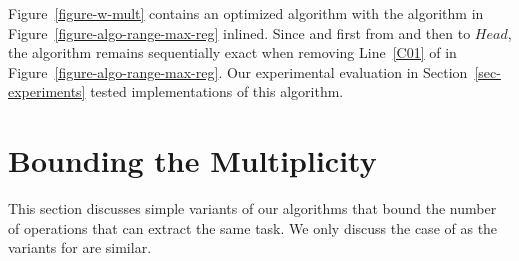 Figure~\ref{figure-w-mult} contains an optimized \NCWSM algorithm with the \RangeMaxReg algorithm in Figure~\ref{figure-algo-range-max-reg} inlined. Since \Take and \Steal first \RMaxR from and then \RMaxW to \(Head\), the algorithm remains sequentially exact when removing Line~\ref{C01} of \RMaxW in Figure~\ref{figure-algo-range-max-reg}. Our experimental evaluation in Section~\ref{sec-experiments} tested implementations of this algorithm.

\section{Bounding the Multiplicity\label{sec-bound-mult}}

This section discusses simple variants of our algorithms that bound the number of operations that can extract the same task.  We only discuss the case of \WFWSM as the variants for \NCWSM are similar.

